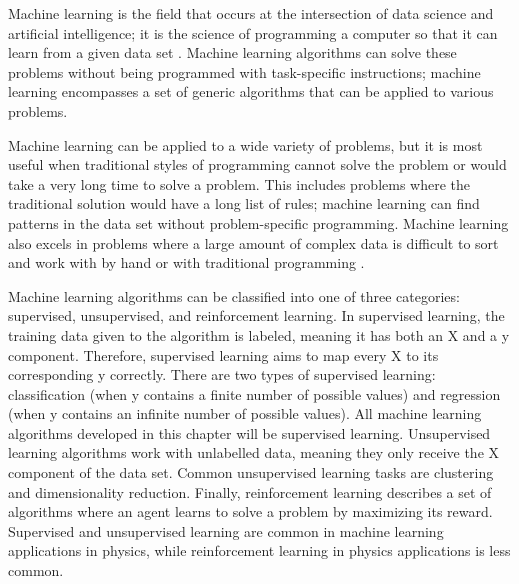 Machine learning is the field that occurs at the intersection of data science and artificial intelligence; it is the science of programming a computer so that it can learn from a given data set \cite{Ref12}. Machine learning algorithms can solve these problems without being programmed with task-specific instructions; machine learning encompasses a set of generic algorithms that can be applied to various problems.

Machine learning can be applied to a wide variety of problems, but it is most useful when traditional styles of programming cannot solve the problem or would take a very long time to solve a problem. This includes problems where the traditional solution would have a long list of rules; machine learning can find patterns in the data set without problem-specific programming. Machine learning also excels in problems where a large amount of complex data is difficult to sort and work with by hand or with traditional programming \cite{Ref12}.


Machine learning algorithms can be classified into one of three categories: supervised, unsupervised, and reinforcement learning. In supervised learning, the training data given to the algorithm is labeled, meaning it has both an X and a y component. Therefore, supervised learning aims to map every X to its corresponding y correctly. There are two types of supervised learning: classification (when y contains a finite number of possible values) and regression (when y contains an infinite number of possible values). All machine learning algorithms developed in this chapter will be supervised learning. Unsupervised learning algorithms work with unlabelled data, meaning they only receive the X component of the data set. Common unsupervised learning tasks are clustering and dimensionality reduction. Finally, reinforcement learning describes a set of algorithms where an agent learns to solve a problem by maximizing its reward. Supervised and unsupervised learning are common in machine learning applications in physics, while reinforcement learning in physics applications is less common.  

